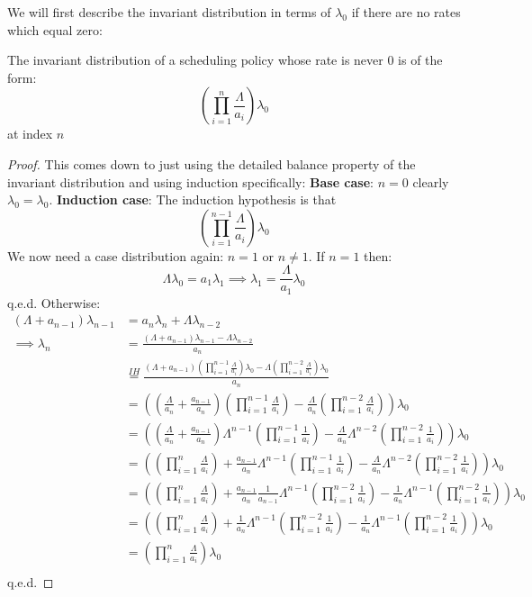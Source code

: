 We will first describe the invariant distribution in terms of $\lambda_0$ if there are no rates which equal zero:
\begin{lemma}\label{lem:InvariantDistributionValue}
  The invariant distribution of a scheduling policy whose rate is never $0$ is of the form:
  $$\left(\prod_{i=1}^{n} \frac{\Lambda}{a_i}\right)\lambda_0$$
  at index $n$
\end{lemma}

\begin{proof}
  This comes down to just using the detailed balance property of the invariant distribution and using induction
  specifically:
  \textbf{Base case}: $n = 0$ clearly $\lambda_0 = \lambda_0$.
  \textbf{Induction case}:
  The induction hypothesis is that $$\left(\prod_{i=1}^{n-1} \frac{\Lambda}{a_i}\right)\lambda_0$$
  We now need a case distribution again:
  $n = 1$ or $n \neq 1$.
  If $n = 1$ then:
    $$\Lambda \lambda_0 = a_1 \lambda_1 \implies \lambda_1 = \frac{\Lambda}{a_1} \lambda_0$$ q.e.d.
  Otherwise:
  \begin{align*}
    (\Lambda + a_{n-1})\lambda_{n-1} &= a_n \lambda_n + \Lambda \lambda_{n-2}\\
    \implies \lambda_n &= \frac{(\Lambda + a_{n-1})\lambda_{n-1} - \Lambda \lambda_{n-2}}{a_n}\\
    &\overset{IH}{=} \frac{(\Lambda + a_{n-1})\left(\prod_{i=1}^{n-1} \frac{\Lambda}{a_i}\right)\lambda_0 -
    \Lambda \left(\prod_{i=1}^{n-2} \frac{\Lambda}{a_i}\right)\lambda_0}{a_n}\\
    &= \left({(\frac{\Lambda}{a_n} + \frac{a_{n-1}}{a_n})\left(\prod_{i=1}^{n-1} \frac{\Lambda}{a_i}\right) -
    \frac{\Lambda}{a_n} \left(\prod_{i=1}^{n-2} \frac{\Lambda}{a_i}\right)}\right)\lambda_0\\
    &= \left({(\frac{\Lambda}{a_n} + \frac{a_{n-1}}{a_n})\Lambda^{n-1}\left(\prod_{i=1}^{n-1} \frac{1}{a_i}\right) -
    \frac{\Lambda}{a_n} \Lambda^{n-2 }\left(\prod_{i=1}^{n-2} \frac{1}{a_i}\right)}\right)\lambda_0\\
    &= \left({\left(\prod_{i=1}^{n} \frac{\Lambda}{a_i}\right) + \frac{a_{n-1}}{a_n}\Lambda^{n-1}\left(\prod_{i=1}^{n-1} \frac{1}{a_i}\right) -
    \frac{\Lambda}{a_n} \Lambda^{n-2 }\left(\prod_{i=1}^{n-2} \frac{1}{a_i}\right)}\right)\lambda_0\\
    &= \left({\left(\prod_{i=1}^{n} \frac{\Lambda}{a_i}\right) + \frac{a_{n-1}}{a_n} \frac{1}{a_{n-1}}\Lambda^{n-1}\left(\prod_{i=1}^{n-2} \frac{1}{a_i}\right) -
    \frac{1}{a_n} \Lambda^{n-1}\left(\prod_{i=1}^{n-2} \frac{1}{a_i}\right)}\right)\lambda_0\\
    &= \left({\left(\prod_{i=1}^{n} \frac{\Lambda}{a_i}\right) + \frac{1}{a_n}\Lambda^{n-1}\left(\prod_{i=1}^{n-2} \frac{1}{a_i}\right) -
    \frac{1}{a_n} \Lambda^{n-1}\left(\prod_{i=1}^{n-2} \frac{1}{a_i}\right)}\right)\lambda_0\\
    &= \left(\prod_{i=1}^{n} \frac{\Lambda}{a_i}\right)\lambda_0\\
  \end{align*}
  q.e.d.
\end{proof}

